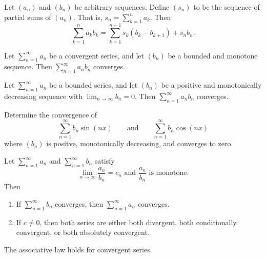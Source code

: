 \begin{theorem}
  Let $(a_n)$ and $(b_n)$ be arbitrary sequences. Define $(s_n)$ to
  be the sequence of partial sums of $(a_n)$. That is, $s_n = \sum_{k
  = 1}^{n} a_k$. Then
  \[ \sum_{k = 1}^{n} a_k b_k = \sum_{k = 1}^{n - 1} s_k (b_k - b_{k
  + 1}) + s_n b_n. \]
\end{theorem}

\begin{proposition}
  Let $\sum_{n = 1}^{\infty} a_n$ be a convergent series, and let
  $(b_n)$ be a bounded and monotone sequence. Then $\sum_{n =
  1}^{\infty} a_n b_n$ converges.
\end{proposition}

\begin{proposition}
  Let $\sum_{n = 1}^{\infty} a_n$ be a bounded series, and let
  $(b_n)$ be a positive and monotonically decreasing sequence with
  $\lim_{n \to \infty} b_n = 0$. Then $\sum_{n = 1}^{\infty} a_n b_n$ converges.
\end{proposition}

\begin{example}
  Determine the convergence of
  \[ \sum_{n = 1}^{\infty} b_n \sin(nx) \qquad \text{and} \qquad
  \sum_{n = 1}^{\infty} b_n \cos(nx) \]
  where $(b_n)$ is positve, monotonically decreasing, and converges to zero.
\end{example}

\begin{proposition}
  Let $\sum_{n = 1}^{\infty} a_n$ and $\sum_{n = 1}^{\infty} b_n$ satisfy
  \[ \text{$\lim_{n \to \infty} \frac{a_n}{b_n} = c_n$ and
  $\frac{a_n}{b_n}$ is monotone.} \]
  Then
  \begin{enumerate}
    \item If $\sum_{n = 1}^{\infty} b_n$ converges, then $\sum_{n =
      1}^{\infty} a_n$ converges.
    \item If $c \neq 0$, then both series are either both divergent,
      both conditionally convergent, or both absolutely convergent.
  \end{enumerate}
\end{proposition}

\begin{theorem}
  The associative law holds for convergent series.
\end{theorem}

